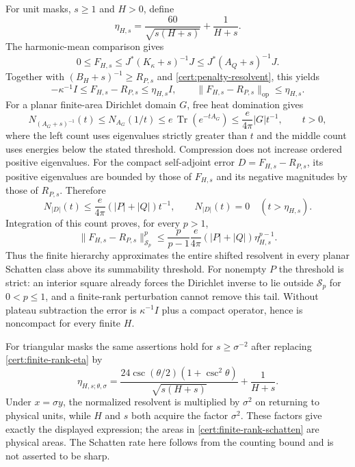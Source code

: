 \documentclass[11pt,reqno]{amsart}
\numberwithin{equation}{section}
\newcommand{\norm}[1]{\lVert#1\rVert}
\begin{document}
For unit masks, $s\ge1$ and $H>0$, define
\begin{equation}\label{cert:finite-rank-eta}
 \eta_{H,s}=\frac{60}{\sqrt{s(H+s)}}+\frac1{H+s}.
\end{equation}
The harmonic-mean comparison gives
\[
 0\le F_{H,s}\le J^*(K_\kappa+s)^{-1}J
                 \le J^*(A_Q+s)^{-1}J.
\]
Together with $(B_H+s)^{-1}\ge R_{P,s}$ and
\eqref{cert:penalty-resolvent}, this yields
\[
 -\kappa^{-1}I\le F_{H,s}-R_{P,s}\le\eta_{H,s}I,
 \qquad
 \norm{F_{H,s}-R_{P,s}}_{\mathrm{op}}\le\eta_{H,s}.
\]
For a planar finite-area Dirichlet domain $G$, free heat
domination gives
\[
 N_{(A_G+s)^{-1}}(t)
 \le N_{A_G}(1/t)
 \le e\,\operatorname{Tr}(e^{-tA_G})
 \le\frac e{4\pi}|G|t^{-1},\qquad t>0,
\]
where the left count uses eigenvalues strictly greater than $t$
and the middle count uses energies below the stated threshold.
Compression does not increase ordered positive eigenvalues.
For the compact self-adjoint error
$D=F_{H,s}-R_{P,s}$, its positive eigenvalues are bounded by
those of $F_{H,s}$ and its negative magnitudes by those of
$R_{P,s}$.  Therefore
\[
 N_{|D|}(t)\le\frac e{4\pi}(|P|+|Q|)t^{-1},
 \qquad N_{|D|}(t)=0\quad(t>\eta_{H,s}).
\]
Integration of this count proves, for every $p>1$,
\begin{equation}\label{cert:finite-rank-schatten}
 \boxed{\quad
 \norm{F_{H,s}-R_{P,s}}_{\mathcal S_p}^{p}
 \le\frac p{p-1}\frac e{4\pi}(|P|+|Q|)
                                  \eta_{H,s}^{p-1}.
 \quad}
\end{equation}
Thus the finite hierarchy approximates the entire shifted
resolvent in every planar Schatten class above its summability
threshold.  For nonempty $P$ the threshold is strict: an interior
square already forces the Dirichlet inverse to lie outside
$\mathcal S_p$ for $0<p\le1$, and a finite-rank perturbation
cannot remove this tail.  Without plateau subtraction the error
is $\kappa^{-1}I$ plus a compact operator, hence is noncompact
for every finite $H$.

For triangular masks the same assertions hold for
$s\ge\sigma^{-2}$ after replacing \eqref{cert:finite-rank-eta} by
\[
 \eta_{H,s;\theta,\sigma}
 =\frac{24\csc(\theta/2)(1+\csc^2\theta)}
          {\sqrt{s(H+s)}}+\frac1{H+s}.
\]
Under $x=\sigma y$, the normalized resolvent is multiplied by
$\sigma^2$ on returning to physical units, while $H$ and $s$
both acquire the factor $\sigma^2$.  These factors give exactly
the displayed expression; the areas in
\eqref{cert:finite-rank-schatten} are physical areas.
The Schatten rate here follows from the counting bound and is
not asserted to be sharp.
\end{document}
